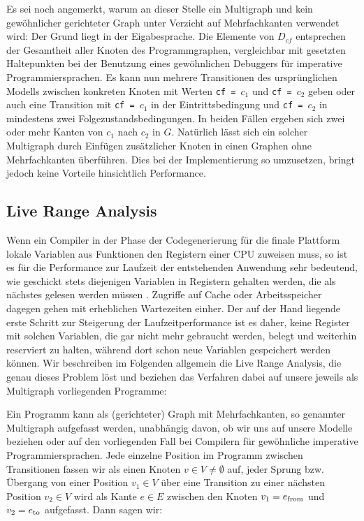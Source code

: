 \documentclass[a4paper]{article}
\theoremstyle{nonumberplain}
\begin{document}
Es sei noch angemerkt, warum an dieser Stelle ein Multigraph und kein gewöhnlicher gerichteter Graph unter Verzicht auf Mehrfachkanten verwendet wird: Der Grund liegt in der Eigabesprache. Die Elemente von $D_{cf}$ entsprechen der Gesamtheit aller Knoten des Programmgraphen, vergleichbar mit gesetzten Haltepunkten bei der Benutzung eines gewöhnlichen Debuggers für imperative Programmiersprachen. Es kann nun mehrere Transitionen des ursprünglichen Modells zwischen konkreten Knoten mit Werten \texttt{cf = }$c_1$ und \texttt{cf = }$c_2$ geben oder auch eine Transition mit \texttt{cf = }$c_1$ in der Eintrittsbedingung und \texttt{cf = }$c_2$ in mindestens zwei Folgezustandsbedingungen. In beiden Fällen ergeben sich zwei oder mehr Kanten von $c_1$ nach $c_2$ in $G$.
Natürlich lässt sich ein solcher Multigraph durch Einfügen zusätzlicher Knoten in einen Graphen ohne Mehrfachkanten überführen. Dies bei der Implementierung so umzusetzen, bringt jedoch keine Vorteile hinsichtlich Performance.

\subsection{Live Range Analysis}

Wenn ein Compiler in der Phase der Codegenerierung für die finale Plattform lokale Variablen aus Funktionen den Registern einer CPU zuweisen muss, so ist es für die Performance zur Laufzeit der entstehenden Anwendung sehr bedeutend, wie geschickt stets diejenigen Variablen in Registern gehalten werden, die als nächstes gelesen werden müssen \cite{Krau14}. %
Zugriffe auf Cache oder Arbeitsspeicher dagegen gehen mit erheblichen Wartezeiten einher. Der auf der Hand liegende erste Schritt zur Steigerung der Laufzeitperformance ist es daher, keine Register mit solchen Variablen, die gar nicht mehr gebraucht werden, belegt und weiterhin reserviert zu halten, während dort schon neue Variablen gespeichert werden können.
Wir beschreiben im Folgenden allgemein die Live Range Analysis, die genau dieses Problem löst und beziehen das Verfahren dabei auf unsere jeweils als Multigraph vorliegenden Programme:

Ein Programm kann als (gerichteter) Graph mit Mehrfachkanten, so genannter Multigraph \mgtup{} aufgefasst werden, unabhängig davon, ob wir uns auf unsere Modelle beziehen oder auf den vorliegenden Fall bei Compilern für gewöhnliche imperative Programmiersprachen.
Jede einzelne Position im Programm zwischen Transitionen fassen wir als einen Knoten $v\in V \neq \emptyset$ auf, jeder Sprung bzw. Übergang von einer Position $v_1\in V$ über eine Transition zu einer nächsten Position $v_2 \in V$ wird als Kante $e \in E$ zwischen den Knoten $v_1 = e_{\mathrm{from}}$ und $v_2 = e_{\mathrm{to}}$ aufgefasst.
Dann sagen wir: 
\end{document}
